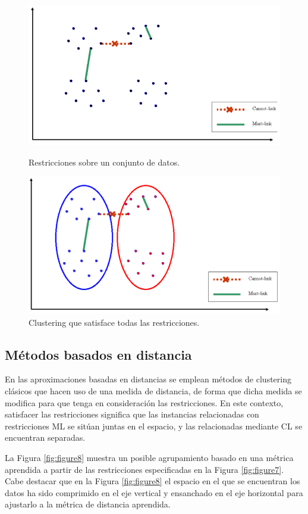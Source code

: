 \begin{figure}[bth]
	\myfloatalign
	{\includegraphics[width=.6\linewidth]{imagenes/c3/InputInstancesAndConst1}
	\caption[Restricciones sobre un conjunto de datos.]{Restricciones sobre un conjunto de datos. \cite{Survey:2007}} \label{fig:figure5}
	}
	{\includegraphics[width=.6\linewidth]{imagenes/c3/ClusteringSatAll}
	\caption[Clustering que satisface todas las restricciones.]{Clustering que satisface todas las restricciones. \cite{Survey:2007}} \label{fig:figure6}
	}
\end{figure}

\subsection{Métodos basados en distancia}

En las aproximaciones basadas en distancias se emplean métodos de clustering clásicos que hacen uso de una medida de distancia, de forma que dicha medida se modifica para que tenga en consideración las restricciones. En este contexto, satisfacer las restricciones significa que las instancias relacionadas con restricciones \acf{ML} se sitúan juntas en el espacio, y las relacionadas mediante \acf{CL} se encuentran separadas.

La Figura \ref{fig:figure8} muestra un posible agrupamiento basado en una métrica aprendida a partir de las restricciones especificadas en la Figura \ref{fig:figure7}. Cabe destacar que en la Figura \ref{fig:figure8} el espacio en el que se encuentran los datos ha sido comprimido en el eje vertical y ensanchado en el eje horizontal para ajustarlo a la métrica de distancia aprendida.

